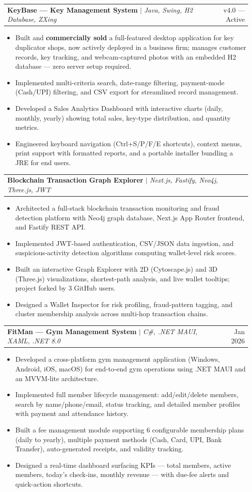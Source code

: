 \documentclass[a4paper,10pt]{article}
\makeatletter
\newcommand{\resumeItem}[1]{
  \item\small{
    {#1 \vspace{-2pt}}
  }
}
\newcommand{\resumeProjectHeading}[2]{
    \item
    \begin{tabular*}{0.97\textwidth}{l@{\extracolsep{\fill}}r}
      \small#1 & #2 \\
    \end{tabular*}\vspace{-7pt}
}
\newcommand{\resumeItemListStart}{\begin{itemize}}
\newcommand{\resumeItemListEnd}{\end{itemize}\vspace{-5pt}}
\makeatother
\begin{document}
      \resumeProjectHeading
          {\textbf{KeyBase --- Key Management System} $|$ \emph{Java, Swing, H2 Database, ZXing}}{v4.0 --- Active}
          \resumeItemListStart
            \resumeItem{Built and \textbf{commercially sold} a full-featured desktop application for key duplicator shops, now actively deployed in a business firm; manages customer records, key tracking, and webcam-captured photos with an embedded H2 database --- zero server setup required.}
            \resumeItem{Implemented multi-criteria search, date-range filtering, payment-mode (Cash/UPI) filtering, and CSV export for streamlined record management.}
            \resumeItem{Developed a Sales Analytics Dashboard with interactive charts (daily, monthly, yearly) showing total sales, key-type distribution, and quantity metrics.}
            \resumeItem{Engineered keyboard navigation (Ctrl+S/P/F/E shortcuts), context menus, print support with formatted reports, and a portable installer bundling a JRE for end users.}
          \resumeItemListEnd

      \resumeProjectHeading
          {\textbf{Blockchain Transaction Graph Explorer} $|$ \emph{Next.js, Fastify, Neo4j, Three.js, JWT}}{}
          \resumeItemListStart
            \resumeItem{Architected a full-stack blockchain transaction monitoring and fraud detection platform with Neo4j graph database, Next.js App Router frontend, and Fastify REST API.}
            \resumeItem{Implemented JWT-based authentication, CSV/JSON data ingestion, and suspicious-activity detection algorithms computing wallet-level risk scores.}
            \resumeItem{Built an interactive Graph Explorer with 2D (Cytoscape.js) and 3D (Three.js) visualizations, shortest-path analysis, and live wallet tooltips; project forked by 3 GitHub users.}
            \resumeItem{Designed a Wallet Inspector for risk profiling, fraud-pattern tagging, and cluster membership analysis across multi-hop transaction chains.}
          \resumeItemListEnd

      \resumeProjectHeading
          {\textbf{FitMan --- Gym Management System} $|$ \emph{C\#, .NET MAUI, XAML, .NET 8.0}}{Jan 2026}
          \resumeItemListStart
            \resumeItem{Developed a cross-platform gym management application (Windows, Android, iOS, macOS) for end-to-end gym operations using .NET MAUI and an MVVM-lite architecture.}
            \resumeItem{Implemented full member lifecycle management: add/edit/delete members, search by name/phone/email, status tracking, and detailed member profiles with payment and attendance history.}
            \resumeItem{Built a fee management module supporting 6 configurable membership plans (daily to yearly), multiple payment methods (Cash, Card, UPI, Bank Transfer), auto-generated receipts, and validity tracking.}
            \resumeItem{Designed a real-time dashboard surfacing KPIs --- total members, active members, today's check-ins, monthly revenue --- with due-fee alerts and quick-action shortcuts.}
          \resumeItemListEnd
\end{document}
